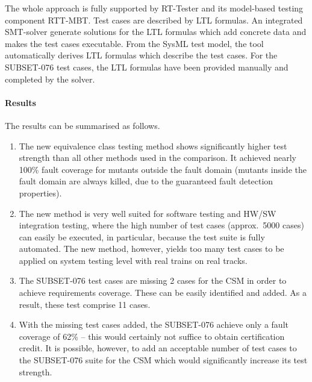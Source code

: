 The whole approach is fully supported by RT-Tester and its model-based
testing component RTT-MBT. Test cases are described by LTL
formulas. An integrated SMT-solver generate solutions for the LTL
formulas which add  concrete data and makes the test cases
executable. From the SysML test
model, the tool automatically derives LTL
formulas which describe the test cases. For the SUBSET-076 test cases,
the LTL formulas have been provided manually and completed by the
solver. 

\paragraph{Results}
The results can be summarised as follows.
\begin{enumerate}
\item The new equivalence class testing method shows significantly
  higher test strength than all other methods used in the
  comparison. It achieved nearly 100\% fault coverage for mutants
  outside the fault domain (mutants inside the fault domain are always
  killed, due to the guaranteed fault detection properties).

\item The new method is very well suited for software testing and
  HW/SW integration testing, where the high number of test cases
  (approx.~5000 cases) can easily be executed, in particular, because
  the test suite is fully automated. The new method, however, yields
  too many test cases to be applied on system testing level with real
  trains on real tracks.


\item The SUBSET-076 test cases are missing 2 cases for the CSM in order to achieve
requirements coverage. These can be easily identified and added. As a result,
these test comprise 11 cases.

\item With the missing test cases added, the SUBSET-076 achieve only a fault coverage of
62\% -- this would certainly not suffice to obtain certification credit. It is
possible, however, to add an acceptable number of test cases to the SUBSET-076
suite for the CSM which would significantly increase its test strength.


\end{enumerate}


